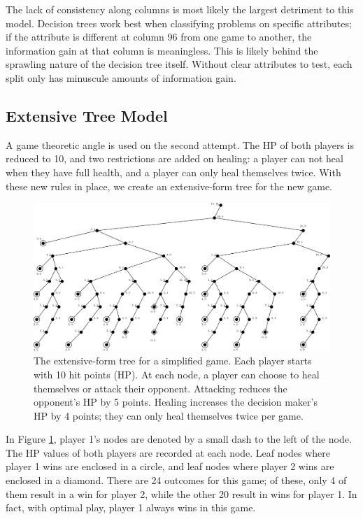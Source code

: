 The lack of consistency along columns is most likely the largest detriment to this model. Decision trees work best when classifying problems on specific attributes; if the attribute is different at column 96 from one game to another, the information gain at that column is meaningless. This is likely behind the sprawling nature of the decision tree itself. Without clear attributes to test, each split only has minuscule amounts of information gain.

\subsection{Extensive Tree Model}
A game theoretic angle is used on the second attempt. The HP of both players is reduced to 10, and two restrictions are added on healing: a player can not heal when they have full health, and a player can only heal themselves twice. With these new rules in place, we create an extensive-form tree for the new game.\\

\begin{figure}[H]
  \centering
  \includegraphics[width=15cm]{figures/GameTree.png}
  \caption{The extensive-form tree for a simplified game. Each player starts with 10 hit points (HP). At each node, a player can choose to heal themselves or attack their opponent. Attacking reduces the opponent's HP by 5 points. Healing increases the decision maker's HP by 4 points; they can only heal themselves twice per game.}
  \label{fig:gameTree}
\end{figure}

In Figure \ref{fig:gameTree}, player 1's nodes are denoted by a small dash to the left of the node. The HP values of both players are recorded at each node. Leaf nodes where player 1 wins are enclosed in a circle, and leaf nodes where player 2 wins are enclosed in a diamond. There are 24 outcomes for this game; of these, only 4 of them result in a win for player 2, while the other 20 result in wins for player 1. In fact, with optimal play, player 1 always wins in this game.\\

